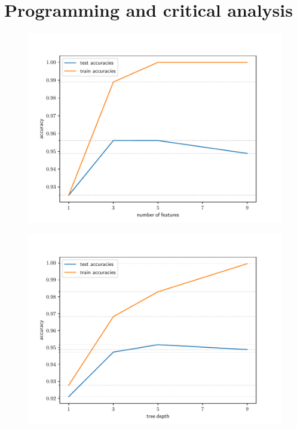 \documentclass{exam}
\begin{document}
    \section{Programming and critical analysis}
    \begin{questions}
        \setcounter{question}{4}
        \item
        \begin{parts}
            \item { \quad}
            \vspace{-3.0em}
            \begin{figure}[H]
                \centering
                {\includegraphics[scale = 0.60]{accuracy_n_features.pdf} }
            \end{figure}
            \item  {\quad}
            \vspace{-3.0em}
            \begin{figure}[H]
                \centering
                {\includegraphics[scale = 0.60]{accuracy_n_tree_depths.pdf} }

\end{figure}
\end{parts}
\end{questions}
\end{document}
